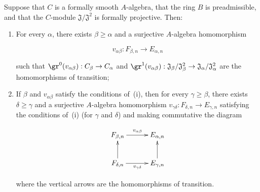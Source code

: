 \begin{lemma}[19.5.6.3]
\label{0.19.5.6.3}
Suppose that $C$ is a formally smooth $A$-algebra, that the ring $B$ is preadmissible, and that the $C$-module $\mathfrak{J}/\mathfrak{J}^2$ is formally projective.
Then:
\begin{enumerate}
  \item[\rm(i)] For every $\alpha$, there exists $\beta\geq\alpha$ and a surjective $A$-algebra homomorphism
  
\[
v_{\alpha\beta}:F_{\beta,n}\to E_{\alpha,n}
\]

  such that $\gr^0(v_{\alpha\beta}):C_\beta\to C_\alpha$ and $\gr^1(v_{\alpha\beta}):\mathfrak{J}_\beta/\mathfrak{J}_\beta^2\to\mathfrak{J}_\alpha/\mathfrak{J}_\alpha^2$ are the homomorphisms of transition;
  \item[\rm(ii)] If $\beta$ and $v_{\alpha\beta}$ satisfy the conditions of~{\rm(i)}, then for every $\gamma\geq\beta$, there exists $\delta\geq\gamma$ and a surjective $A$-algebra homomorphism $v_{\gamma\delta}:F_{\delta,n}\to E_{\gamma,n}$ satisfying the conditions of~{\rm(i)} (for $\gamma$ and $\delta$) and making commutative the diagram
  
\[
\xymatrix@C=3em{
      F_{\beta,n} \ar[r]^{v_{\alpha\beta}} & E_{\alpha,n} \\
      F_{\delta,n} \ar[u] \ar[r]_{v_{\gamma\delta}} & E_{\gamma,n} \ar[u]
    }
\]

  where the vertical arrows are the homomorphisms of transition.
\end{enumerate}
\end{lemma}

